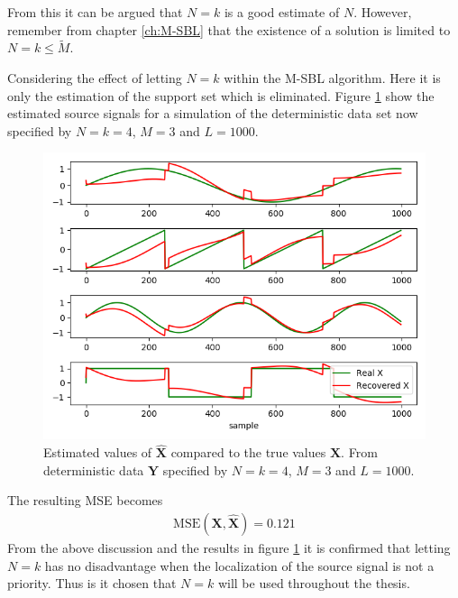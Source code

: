 From this it can be argued that $N = k$ is a good estimate of $N$. 
However, remember from chapter \ref{ch:M-SBL} that the existence of a solution is limited to $N = k \leq \widetilde{M}$.

Considering the effect of letting $N = k$ within the M-SBL algorithm. 
Here it is only the estimation of the support set which is eliminated. 
Figure \ref{fig:M-SBL_simple3} show the estimated source signals for a simulation of the deterministic data set now specified by $N = k = 4$, $M = 3$ and $L = 1000$. 
\begin{figure}[H]
\centering
\includegraphics[scale=0.5]{figures/ch_6/M-SBL_simple3.png}
\caption{Estimated values of $\hat{\textbf{X}}$ compared to the true 				values $\textbf{X}$. From deterministic data $\textbf{Y}$ specified by $N=k=4$, $M = 3$ and $L=1000$.}
\label{fig:M-SBL_simple3}
\end{figure}
\noindent
The resulting MSE becomes
\begin{align*}
\text{MSE}(\mathbf{X}, \hat{\mathbf{X}}) = 0.121
\end{align*}
From the above discussion and the results in figure \ref{fig:M-SBL_simple3} it is confirmed that letting $N = k$ has no disadvantage when the localization of the source signal is not a priority. 
Thus is it chosen that $N = k$ will be used throughout the thesis. 

